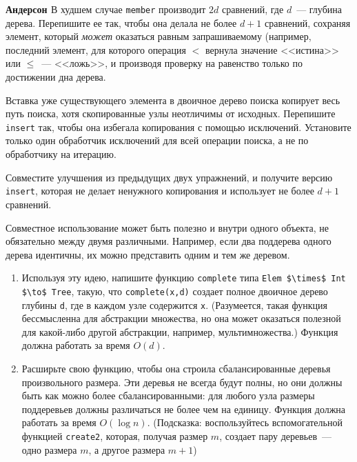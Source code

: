 \begin{exercise}\textbf{Андерсон \cite{Andersson1991}}\label{ex:2.2}
В худшем случае \lstinline!member! производит $2d$ сравнений, где
$d$~--- глубина дерева. Перепишите ее так, чтобы она делала не более
$d+1$ сравнений, сохраняя элемент, который \emph{может} оказаться
равным запрашиваемому (например, последний элемент, для которого
операция $<$ вернула значение <<истина>> или $\le$~--- <<ложь>>, и
производя проверку на равенство только по достижении дна дерева.
\end{exercise}

\begin{exercise}\label{ex:2.3}
  Вставка уже существующего элемента в двоичное дерево поиска копирует
  весь путь поиска, хотя скопированные узлы неотличимы от
  исходных. Перепишите \lstinline!insert! так, чтобы она избегала
  копирования с помощью исключений. Установите только один обработчик
  исключений для всей операции поиска, а не по обработчику на итерацию.
\end{exercise}

\begin{exercise}\label{ex:2.4}
  Совместите улучшения из предыдущих двух упражнений, и получите
  версию \lstinline!insert!, которая не делает ненужного копирования и
  использует не более $d+1$ сравнений.
\end{exercise}

\begin{exercise}\label{ex:2.5}
  Совместное использование может быть полезно и внутри одного объекта, не
  обязательно между двумя различными.  Например, если два поддерева
  одного дерева идентичны, их можно представить одним и тем же
  деревом.
  \begin{enumerate}
  \item Используя эту идею, напишите функцию \lstinline!complete! типа
    \lstinline!Elem $\times$ Int $\to$ Tree!, такую, что
    \lstinline!complete(x,d)! создает полное двоичное дерево глубины
    \lstinline!d!, где в каждом узле содержится \lstinline!x!.
    (Разумеется, такая функция бессмысленна для абстракции множества,
    но она может оказаться полезной для какой-либо другой абстракции,
    например, мультимножества.) Функция должна работать за время $O(d)$.
  \item Расширьте свою функцию, чтобы она строила сбалансированные
    деревья произвольного размера. Эти деревья не всегда будут полны,
    но они должны быть как можно более сбалансированными: для любого
    узла размеры поддеревьев должны различаться не более чем на
    единицу. Функция должна работать за время $O(\log n)$. (Подсказка:
    воспользуйтесь вспомогательной функцией \lstinline!create2!,
    которая, получая размер $m$, создает пару деревьев~--- одно размера
    $m$, а другое размера $m+1$)
  \end{enumerate}
\end{exercise}

